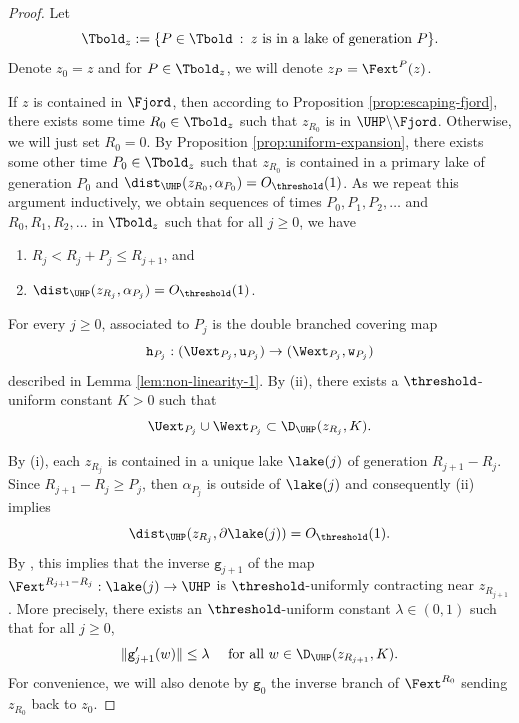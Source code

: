 \documentclass{amsart}
\begin{document}
\begin{proof}
    Let 
    \[
    \Tbold_z := \{ P \in \Tbold \: : \: z \textnormal{ is in a lake of generation }P\}.
    \]
    Denote $z_0 = z$ and for $P \in \Tbold_z$, we will denote $z_P = \Fext^P(z)$.

    If $z$ is contained in $\Fjord$, then according to Proposition \ref{prop:escaping-fjord}, there exists some time $R_0 \in \Tbold_z$ such that $z_{R_0}$ is in $\UHP \backslash \Fjord$.
    Otherwise, we will just set $R_0 = 0$.
    By Proposition \ref{prop:uniform-expansion}, there exists some other time $P_0 \in \Tbold_z$ such that $z_{R_0}$ is contained in a primary lake of generation $P_0$ and $\dist_{\UHP}(z_{R_0}, \alpha_{P_0}) = O_{\threshold}(1)$.
    As we repeat this argument inductively, 
    we obtain sequences of times $P_0, P_1, P_2,\ldots$ and $R_0, R_1, R_2,\ldots$ in $\Tbold_z$ such that for all $j \geq 0$, we have 
    \begin{enumerate}
        \item[(i)] $R_j < R_j + P_j \leq R_{j+1}$, and
        \item[(ii)] $\dist_{\UHP}(z_{R_j}, \alpha_{P_j}) = O_{\threshold}(1)$.
    \end{enumerate}
    
    For every $j \geq 0$, associated to $P_j$ is the double branched covering map 
    \[
        \mathtt{h}_{P_j} : (\Uext_{P_j}, \mathtt{u}_{P_j}) \to (\Wext_{P_j}, \mathtt{w}_{P_j})
    \]
    described in Lemma \ref{lem:non-linearity-1}. 
    By (ii), there exists a $\threshold$-uniform constant $K>0$ such that
    \begin{equation}
    \label{eqn:Usn-Wsn}
        \Uext_{P_j} \cup \Wext_{P_j} \subset \D_{\UHP}({z_{R_j}}, K).
    \end{equation}

    By (i), each $z_{R_j}$ is contained in a unique lake $\lake(j)$ of generation $R_{j+1}-R_j$.
    Since $R_{j+1}-R_j \geq P_j$, then $\alpha_{P_j}$ is outside of $\lake(j)$ and consequently (ii) implies
    \[
        \dist_{\UHP}(z_{R_j}, \partial \lake(j) ) = O_{\threshold}(1).
    \]
    By \cite[Theorem 2.25]{McM94}, this implies that the inverse $\mathtt{g}_{j+1}$ of the map $\Fext^{R_{j+1} - R_j}: \lake(j) \to \UHP$ is $\threshold$-uniformly contracting near $z_{R_{j+1}}$. 
    More precisely, there exists an $\threshold$-uniform constant $\lambda \in (0,1)$ such that for all $j \geq 0$, 
    \begin{equation}
    \label{eqn:absolute-expansion}
        \| \mathtt{g}_{j+1}'(w) \| \leq \lambda
        \quad \text{ for all }
        w \in \D_{\UHP}(z_{R_{j+1}},K).
    \end{equation}
    For convenience, we will also denote by $\mathtt{g}_{0}$ the inverse branch of $\Fext^{R_0}$ sending $z_{R_0}$ back to $z_0$.
    

\end{proof}
\end{document}
